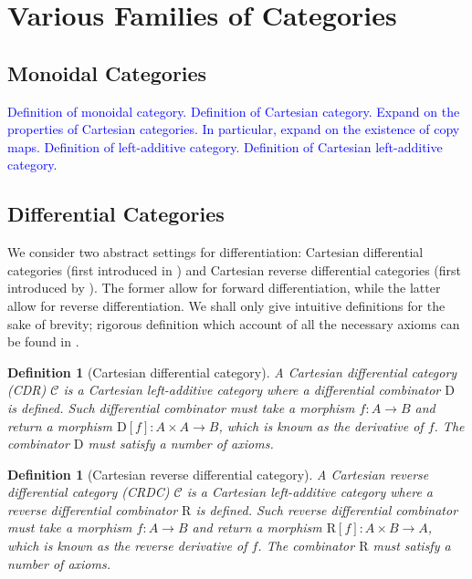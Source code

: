 \documentclass[11pt,a4paper,openright,twoside]{report}
\theoremstyle{plain}
\newtheorem{definition}[proposition]{Definition}
\theoremstyle{definition}
\begin{document}
\section{Various Families of Categories}

\subsection{Monoidal Categories}

\textcolor{blue}{Definition of monoidal category.}
\textcolor{blue}{Definition of Cartesian category.}
\textcolor{blue}{Expand on the properties of Cartesian categories. In particular, expand on the existence of copy maps.}
\textcolor{blue}{Definition of left-additive category.}
\textcolor{blue}{Definition of Cartesian left-additive category.}




\subsection{Differential Categories}

We consider two abstract settings for differentiation: Cartesian differential categories (first introduced in \cite{bluteDifferentialCategories2006}) and Cartesian reverse differential categories (first introduced by \cite{cockettReverseDerivativeCategories2019}). The former allow for forward differentiation, while the latter allow for reverse differentiation. We shall only give intuitive definitions for the sake of brevity; rigorous definition which account of all the necessary axioms can be found in \cite{cockettReverseDerivativeCategories2019}.

\begin{definition}[Cartesian differential category]
  A Cartesian differential category (CDR) $\mathcal{C}$ is a Cartesian left-additive category where a differential combinator $\mathrm{D}$ is defined. Such differential combinator must take a morphism $f: A \to B$ and return a morphism $\mathrm{D}[f]: A \times A \to B$, which is known as the derivative of $f$. The combinator $\mathrm{D}$ must satisfy a number of axioms. 
\end{definition}

\begin{definition}[Cartesian reverse differential category]
  A Cartesian reverse differential category (CRDC) $\mathcal{C}$ is a Cartesian left-additive category where a reverse differential combinator $\mathrm{R}$ is defined. Such reverse differential combinator must take a morphism $f: A \to B$ and return a morphism $\mathrm{R}[f]: A \times B \to A$, which is known as the reverse derivative of $f$. The combinator $\mathrm{R}$ must satisfy a number of axioms. 
\end{definition}
\end{document}
